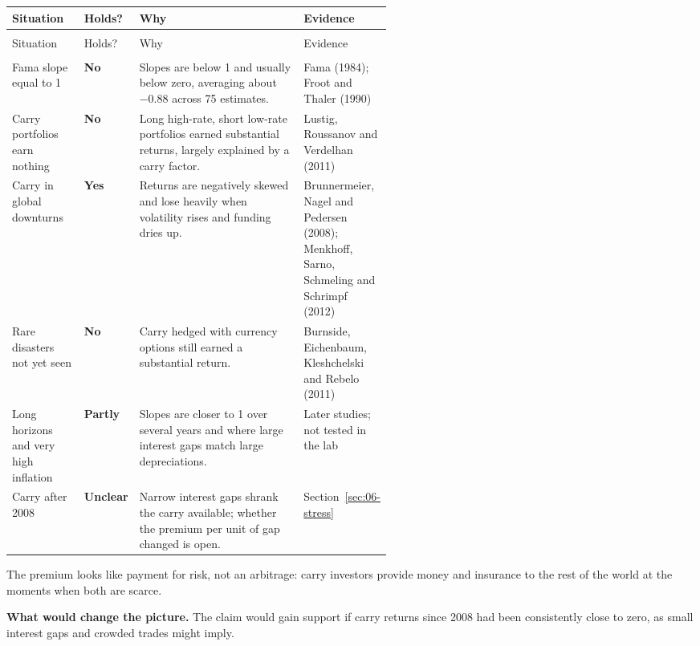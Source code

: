 {\small
\begin{longtable}{@{}>{\raggedright\arraybackslash}p{0.19\linewidth}>{\raggedright\arraybackslash}p{0.13\linewidth}>{\raggedright\arraybackslash}p{}>{\raggedright\arraybackslash}p{0.23\linewidth}@{}}
\toprule
Situation & Holds? & Why & Evidence \\
\midrule
\endfirsthead
\multicolumn{4}{@{}l}{\emph{(continued)}} \\
\toprule
Situation & Holds? & Why & Evidence \\
\midrule
\endhead
\midrule
\multicolumn{4}{r@{}}{\emph{(continued on the next page)}} \\
\endfoot
\bottomrule
\endlastfoot
Fama slope equal to 1 & \textbf{No} & Slopes are below 1 and usually below zero, averaging about $-0.88$ across 75 estimates. & Fama (1984); Froot and Thaler (1990) \\*
\addlinespace[3pt]
Carry portfolios earn nothing & \textbf{No} & Long high-rate, short low-rate portfolios earned substantial returns, largely explained by a carry factor. & Lustig, Roussanov and Verdelhan (2011) \\
\addlinespace[3pt]
Carry in global downturns & \textbf{Yes} & Returns are negatively skewed and lose heavily when volatility rises and funding dries up. & Brunnermeier, Nagel and Pedersen (2008); Menkhoff, Sarno, Schmeling and Schrimpf (2012) \\
\addlinespace[3pt]
Rare disasters not yet seen & \textbf{No} & Carry hedged with currency options still earned a substantial return. & Burnside, Eichenbaum, Kleshchelski and Rebelo (2011) \\
\addlinespace[3pt]
Long horizons and very high inflation & \textbf{Partly} & Slopes are closer to 1 over several years and where large interest gaps match large depreciations. & Later studies; not tested in the lab \\*
\addlinespace[3pt]
Carry after 2008 & \textbf{Unclear} & Narrow interest gaps shrank the carry available; whether the premium per unit of gap changed is open. & Section~\ref{sec:06-stress} \\
\end{longtable}
\addtocounter{table}{-1}%
}

The premium looks like payment for risk, not an arbitrage: carry investors provide money and insurance to the rest of the world at the moments when both are scarce.

\textbf{What would change the picture.} The claim would gain support if carry returns since 2008 had been consistently close to zero, as small interest gaps and crowded trades might imply.

